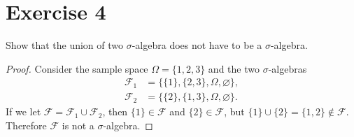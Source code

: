 \documentclass[12pt]{article}
\newenvironment{problem}
    {\begin{lrbox}{\mybox}\begin{minipage}{\textwidth-10pt}}
    {\end{minipage}\end{lrbox}\framebox[6.5in]{\usebox{\mybox}}}
\let\emptyset\varnothing
\newcommand{\FF}{\mathcal{F}}
\begin{document}
\section*{Exercise 4}
\begin{problem}
    Show that the union of two $\sigma$-algebra does not have to be a $\sigma$-algebra.
\end{problem}

\begin{proof}
    Consider the sample space $\Omega=\{1,2,3\}$ and the two $\sigma$-algebras
    \begin{align*}
        \FF_1 &= \{\{1\},\{2,3\},\Omega,\emptyset\}, \\
        \FF_2 &= \{\{2\},\{1,3\},\Omega,\emptyset\}.
    \end{align*}
    If we let $\FF=\FF_1\cup\FF_2$, then $\{1\}\in\FF$ and $\{2\}\in\FF$, but $\{1\}\cup\{2\}=\{1,2\}\notin\FF$. Therefore $\FF$ is not a $\sigma$-algebra.
    
\end{proof}
\end{document}
